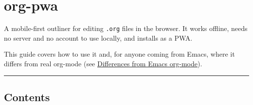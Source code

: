 \documentclass[11pt]{article}
\author{root}
\date{\today}
\title{}
\begin{document}
\tableofcontents

\section{org-pwa}
\label{sec:org6135f18}
A mobile-first outliner for editing \texttt{.org} files in the browser. It works offline, needs no server and no account to use locally, and installs as a PWA.

This guide covers how to use it and, for anyone coming from Emacs, where it differs from real org-mode (see \hyperref[sec:org634683a]{Differences from Emacs org-mode}).

\noindent\rule{\textwidth}{0.5pt}

\subsection{Contents}
\label{sec:org2527b37}
\end{document}
